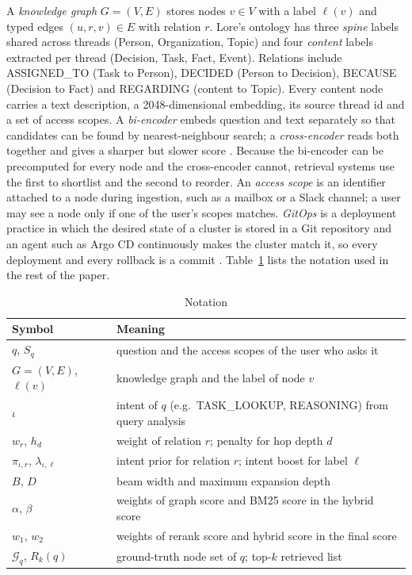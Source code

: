\documentclass[12pt,onecolumn,draftclsnofoot]{IEEEtran}
\begin{document}
A \emph{knowledge graph} $G=(V,E)$ stores nodes $v\in V$ with a label $\ell(v)$ and typed edges $(u,r,v)\in E$ with relation $r$. Lore's ontology has three \emph{spine} labels shared across threads (Person, Organization, Topic) and four \emph{content} labels extracted per thread (Decision, Task, Fact, Event). Relations include ASSIGNED\_TO (Task to Person), DECIDED (Person to Decision), BECAUSE (Decision to Fact) and REGARDING (content to Topic). Every content node carries a text description, a 2048-dimensional embedding, its source thread id and a set of access scopes. A \emph{bi-encoder} embeds question and text separately so that candidates can be found by nearest-neighbour search; a \emph{cross-encoder} reads both together and gives a sharper but slower score \cite{nogueira2019rerank}. Because the bi-encoder can be precomputed for every node and the cross-encoder cannot, retrieval systems use the first to shortlist and the second to reorder. An \emph{access scope} is an identifier attached to a node during ingestion, such as a mailbox or a Slack channel; a user may see a node only if one of the user's scopes matches. \emph{GitOps} is a deployment practice in which the desired state of a cluster is stored in a Git repository and an agent such as Argo CD continuously makes the cluster match it, so every deployment and every rollback is a commit \cite{argocd2026docs}. Table~\ref{tab:notation} lists the notation used in the rest of the paper.

\begin{table}[t]
\centering
\caption{Notation}
\label{tab:notation}
\footnotesize
\begin{tabular}{@{}ll@{}}
\toprule
Symbol & Meaning \\
\midrule
$q$, $S_q$ & question and the access scopes of the user who asks it \\
$G=(V,E)$, $\ell(v)$ & knowledge graph and the label of node $v$ \\
$\iota$ & intent of $q$ (e.g.\ TASK\_LOOKUP, REASONING) from query analysis \\
$w_r$, $h_d$ & weight of relation $r$; penalty for hop depth $d$ \\
$\pi_{\iota,r}$, $\lambda_{\iota,\ell}$ & intent prior for relation $r$; intent boost for label $\ell$ \\
$B$, $D$ & beam width and maximum expansion depth \\
$\alpha$, $\beta$ & weights of graph score and BM25 score in the hybrid score \\
$w_1$, $w_2$ & weights of rerank score and hybrid score in the final score \\
$\mathcal{G}_q$, $R_k(q)$ & ground-truth node set of $q$; top-$k$ retrieved list \\
\bottomrule
\end{tabular}
\end{table}
\end{document}
